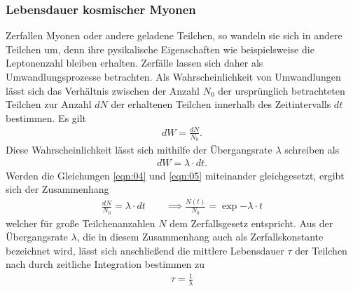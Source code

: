 \subsubsection{Lebensdauer kosmischer Myonen}
\noindent Zerfallen Myonen oder andere geladene Teilchen, so wandeln sie sich in
andere Teilchen um, denn ihre pysikalische Eigenschaften wie beispielsweise die
Leptonenzahl bleiben erhalten. Zerfälle lassen sich daher als Umwandlungsprozesse
betrachten. Als Wahrscheinlichkeit von Umwandlungen lässt sich das Verhältnis
zwischen der Anzahl $N_0$ der ursprünglich betrachteten Teilchen zur Anzahl
$dN$ der erhaltenen Teilchen innerhalb des Zeitintervalls $dt$
bestimmen. Es gilt
\begin{align}
  dW = \frac{dN}{N_0}.
  \label{eqn:04}
\end{align}
\noindent Diese Wahrscheinlichkeit lässt sich mithilfe der Übergangsrate
$\lambda$ schreiben als
\begin{align}
  dW = \lambda \cdot dt.
  \label{eqn:05}
\end{align}
\noindent Werden die Gleichungen \ref{eqn:04} und \ref{eqn:05} miteinander
gleichgesetzt, ergibt sich der Zusammenhang
\begin{align}
  \frac{dN}{N_0} = \lambda \cdot dt \qquad \implies \frac{N(t)}{N_0} = \exp{-\lambda \cdot t}
  \label{eqn:06}
\end{align}
\noindent welcher für große Teilchenanzahlen $N$ dem Zerfallsgesetz entspricht.
Aus der Übergangsrate $\lambda$, die in diesem Zusammenhang auch als
Zerfallskonstante bezeichnet wird, lässt sich anschließend die mittlere
Lebensdauer $\tau$ der Teilchen nach \cite{teilchen} durch zeitliche Integration
bestimmen zu
\begin{align}
  \tau = \frac{1}{\lambda}
  \label{eqn:07}
\end{align}
